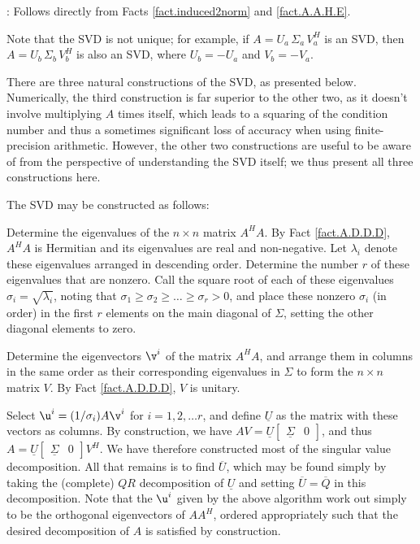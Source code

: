 \/:  Follows directly from Facts \ref{fact.induced2norm} and \ref{fact.A.A.H.E}. \vskip0.1in

Note that the SVD is not unique; for example, if $A=U_a \,\Sigma_a \,V^{H}_a$ is an SVD, then $A=U_b \,\Sigma_b \,V^{H}_b$ is
also an SVD, where $U_b=-U_a$ and $V_b=-V_a$.

There are three natural constructions of the SVD, as presented below.  Numerically, the third construction is far superior to the other two,
as it doesn't involve multiplying $A$ times itself, which leads to a squaring of the condition number and thus a sometimes significant
loss of accuracy when using finite-precision arithmetic.
However, the other two constructions are useful to be aware of from the perspective of understanding the SVD itself; we thus present all three constructions here.


\noindent The SVD may be constructed as follows:
\beginmydesca
\item[~~~~~~ $\bullet$ Step 1:] Determine the eigenvalues of the $n\times n$ matrix
$A^{H} A$.  By Fact \ref{fact.A.D.D.D}, $A^{H} A$ is Hermitian and its
eigenvalues are real and non-negative.  Let $\lambda_{i}$ denote these
eigenvalues arranged in descending order.  Determine the number $r$ of
these eigenvalues that are nonzero.  Call the square root of each of
these eigenvalues $\sigma_{i}=\sqrt{\lambda_{i}}$, noting that
$\sigma_{1}\ge\sigma_{2}\ge \ldots \ge \sigma_{r}> 0$, and place these
nonzero $\sigma_{i}$ (in order) in the first $r$ elements on the main
diagonal of $\Sigma$, setting the other diagonal elements to
zero.\medskip
\item[~~~~~~ $\bullet$ Step 2:] Determine the eigenvectors $\v^{i}$
of the matrix $A^{H} A$, and arrange them in columns in the same order
as their corresponding eigenvalues in $\Sigma$ to form the $n\times n$
matrix $V$.  By Fact \ref{fact.A.D.D.D}, $V$ is unitary.\medskip
\item[~~~~~~ $\bullet$ Step 3:] Select $\u^{i}=(1/\sigma_{i}) A\v^{i}$ for
$i=1,2,\ldots r$, and define $\underline U$ as the matrix with these
vectors as columns.  By construction, we have $AV=\underline
U\begin{bmatrix} \underline{\Sigma} & 0 \end{bmatrix}$, and thus
$A=\underline U\begin{bmatrix} \underline{\Sigma} & 0 \end{bmatrix}
V^{H}$.  We have therefore constructed most of the singular value
decomposition.  All that remains is to find $\overline U$, which may
be found simply by taking the (complete) $QR$ decomposition of
$\underline U$ and setting $\overline U=\overline Q$ in this
decomposition. 
\endmydesc
Note that the $\u^{i}$ given by the above algorithm work out simply to
be the orthogonal eigenvectors of $A A^{H}$, ordered appropriately
such that the desired decomposition of $A$ is satisfied by
construction.

